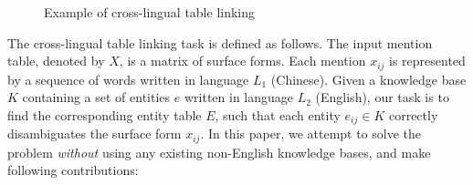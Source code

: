 \begin{figure}[th]
\centering
{}
\caption{Example of cross-lingual table linking}
\label{fig:chinesetable}
\end{figure}

The cross-lingual table linking task is defined as follows.
The input mention table, denoted by $X$, is a matrix of surface forms.
Each mention $x_{ij}$ is represented by a sequence of words written in language $L_1$ (Chinese). 
Given a knowledge base $K$ containing a set of entities $e$ written in language $L_2$ (English),
our task is to find the corresponding entity table $E$,
such that each entity $e_{ij} \in K$ correctly disambiguates the surface form $x_{ij}$. 
In this paper, we attempt to solve the problem {\em without} using any existing non-English knowledge bases,
and make following contributions:





